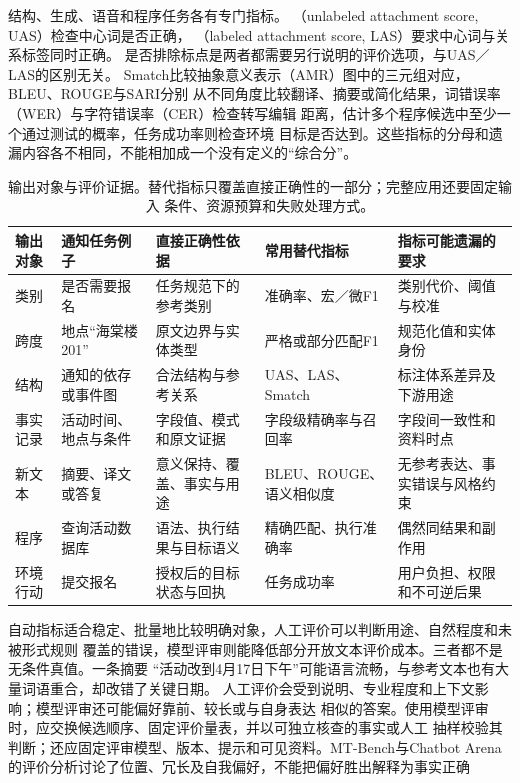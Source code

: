 结构、生成、语音和程序任务各有专门指标。
（unlabeled attachment score, UAS）检查中心词是否正确，
（labeled attachment score, LAS）要求中心词与关系标签同时正确。
是否排除标点是两者都需要另行说明的评价选项，与UAS／LAS的区别无关。
Smatch比较抽象意义表示（AMR）图中的三元组对应，BLEU、ROUGE与SARI分别
从不同角度比较翻译、摘要或简化结果，词错误率（WER）与字符错误率（CER）检查转写编辑
距离，估计多个程序候选中至少一个通过测试的概率，任务成功率则检查环境
目标是否达到。这些指标的分母和遗漏内容各不相同，不能相加成一个没有定义的“综合分”。

\begin{table}[htbp]
  \centering
  \begin{tabularx}{\linewidth}{@{}p{19mm}p{28mm}p{35mm}p{35mm}X@{}}
    \toprule
    输出对象 & 通知任务例子 & 直接正确性依据 & 常用替代指标 & 指标可能遗漏的要求 \\
    \midrule
    类别 & 是否需要报名 & 任务规范下的参考类别 & 准确率、宏／微F1 & 类别代价、阈值与校准 \\
    跨度 & 地点“海棠楼201” & 原文边界与实体类型 & 严格或部分匹配F1 & 规范化值和实体身份 \\
    结构 & 通知的依存或事件图 & 合法结构与参考关系 & UAS、LAS、Smatch & 标注体系差异及下游用途 \\
    事实记录 & 活动时间、地点与条件 & 字段值、模式和原文证据 & 字段级精确率与召回率 & 字段间一致性和资料时点 \\
    新文本 & 摘要、译文或答复 & 意义保持、覆盖、事实与用途 & BLEU、ROUGE、语义相似度 & 无参考表达、事实错误与风格约束 \\
    程序 & 查询活动数据库 & 语法、执行结果与目标语义 & 精确匹配、执行准确率 & 偶然同结果和副作用 \\
    环境行动 & 提交报名 & 授权后的目标状态与回执 & 任务成功率 & 用户负担、权限和不可逆后果 \\
    \bottomrule
  \end{tabularx}
  \caption{输出对象与评价证据。替代指标只覆盖直接正确性的一部分；完整应用还要固定输入
  条件、资源预算和失败处理方式。}
  \label{tab:nlp-output-evidence}
\end{table}

自动指标适合稳定、批量地比较明确对象，人工评价可以判断用途、自然程度和未被形式规则
覆盖的错误，模型评审则能降低部分开放文本评价成本。三者都不是无条件真值。一条摘要
“活动改到4月17日下午”可能语言流畅，与参考文本也有大量词语重合，却改错了关键日期。
人工评价会受到说明、专业程度和上下文影响；模型评审还可能偏好靠前、较长或与自身表达
相似的答案。使用模型评审时，应交换候选顺序、固定评价量表，并以可独立核查的事实或人工
抽样校验其判断；还应固定评审模型、版本、提示和可见资料。MT-Bench与Chatbot Arena
的评价分析讨论了位置、冗长及自我偏好，不能把偏好胜出解释为事实正确

